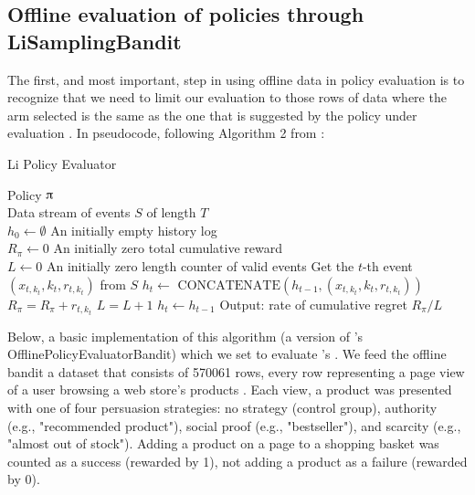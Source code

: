 \documentclass{jss}
\begin{document}
\subsection{Offline evaluation of policies through LiSamplingBandit} \label{offli}

The first, and most important, step in using offline data in policy evaluation is to recognize that we need to limit our evaluation to those rows of data where the arm selected is the same as the one that is suggested by the policy under evaluation \citep{Li2012,Li2011}. In pseudocode, following Algorithm 2 from \cite{Li2011}:

\begin{algorithm}[H]
\caption{Li Policy Evaluator}
\label{Alg:LiBandit}
\begin{algorithmic}
\REQUIRE  Policy $\piup$ \\
                 Data stream of events $S$ of length $T$  \\
                 $h_0 \leftarrow \emptyset$ {An initially empty history log}\\
                 $R_\pi \leftarrow 0$ {An initially zero total cumulative reward}\\
                 $L \leftarrow 0$ {An initially zero length counter of valid events}
	\STATE Get the $t$-th event \( (x_{t,k_t},k_{t},r_{t,k_t}) \) from  $S$
	       \STATE $h_{t} \leftarrow $  \(\textrm{CONCATENATE}\left( h_{t-1},(x_{t,k_t},k_{t},r_{t,k_t})  \right)\)
	       \STATE $R_\pi = R_\pi + r_{t,k_t}$
	       \STATE $L = L + 1$
	\ELSE
	        \STATE $h_{t} \leftarrow  h_{t-1} $
	\ENDIF
\ENDFOR
\STATE Output: rate of cumulative regret $R_\pi / L $
\end{algorithmic}
\end{algorithm}

Below, a basic implementation of this algorithm (a version of 's  OfflinePolicyEvaluatorBandit) which we set to evaluate 's . We feed the offline bandit a dataset that consists of 570061 rows, every row representing a page view of a user browsing a web store's products \citep{Kaptein2018}. Each view, a product was presented with one of four persuasion strategies: no strategy (control group), authority (e.g., "recommended product"), social proof (e.g., "bestseller"), and scarcity (e.g., "almost out of stock"). Adding a product on a page to a shopping basket was counted as a success (rewarded by 1), not adding a product as a failure (rewarded by 0).
\end{document}
